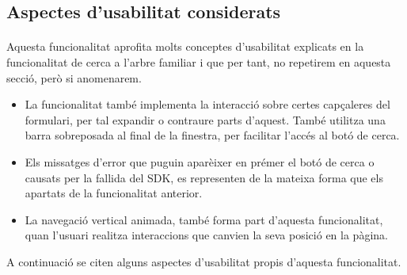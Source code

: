 \subsection{Aspectes d'usabilitat considerats}

    \paragraph{}
    Aquesta funcionalitat aprofita molts conceptes d'usabilitat explicats en la funcionalitat de cerca a l’arbre familiar i que per tant, no repetirem en aquesta secció, però si anomenarem.

    \begin{itemize}
        \item La funcionalitat també implementa la interacció sobre certes capçaleres del formulari, per tal expandir o contraure parts d'aquest. També utilitza una barra sobreposada al final de la finestra, per facilitar l'accés al botó de cerca.
        \item Els missatges d'error que puguin aparèixer en prémer el botó de cerca o causats per la fallida del SDK, es representen de la mateixa forma que els apartats de la funcionalitat anterior.
        \item La navegació vertical animada, també forma part d'aquesta funcionalitat, quan l'usuari realitza interaccions que canvien la seva posició en la pàgina.
    \end{itemize}

    A continuació se citen alguns aspectes d'usabilitat propis d'aquesta funcionalitat.

    
    
    
